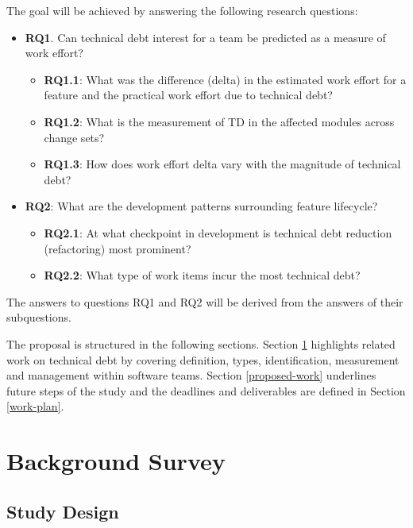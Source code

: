 \documentclass{mprop}
\begin{document}
The goal will be achieved by answering the following research questions:
\begin{itemize}
	\item \textbf{RQ1}. Can technical debt interest for a team be predicted as a
	      measure of work effort?
	      \begin{itemize}
		      \item \textbf{RQ1.1}: What was the difference (delta) in the
		            estimated work effort for a feature and the practical work
		            effort due to technical debt?
		      \item \textbf{RQ1.2}: What is the measurement of TD in the
		            affected modules across change sets?
		      \item \textbf{RQ1.3}: How does work effort delta vary with the
		            magnitude of technical debt?
	      \end{itemize}

	\item \textbf{RQ2}: What are the development patterns surrounding feature
	      lifecycle?
	      \begin{itemize}
		      \item \textbf{RQ2.1}: At what checkpoint in development is
		            technical debt reduction (refactoring) most prominent?
		      \item \textbf{RQ2.2}: What type of work items incur the most
		            technical debt?
	      \end{itemize}
\end{itemize}

The answers to questions RQ1 and RQ2 will be derived from the answers of their
subquestions.

The proposal is structured in the following sections. Section \ref{lit-review}
highlights related work on technical debt by covering definition, types,
identification, measurement and management within software teams. Section
\ref{proposed-work} underlines future steps of the study and the deadlines and
deliverables are defined in Section \ref{work-plan}.

\section{Background Survey}
\label{lit-review}

\subsection{Study Design}
\end{document}
